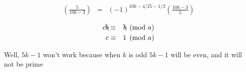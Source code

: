\documentclass[aps,preprint,preprintnumbers,nofootinbib,showpacs,prd]{revtex4-1}
\newcommand{\nbea}{\begin{eqnarray*}}
\newcommand{\neea}{\end{eqnarray*}}
\begin{document}

%
\nbea
\left ( \frac{5}{10k - 3} \right ) & = & (-1)^{10k-4/2 5-1/2} \left ( \frac{10k - 3}{5} \right )
\neea
%




%
\nbea
c\bcancel{b} & \equiv & \bcancel{b} \pmod{a} \\
c & \equiv & 1 \pmod{a}
\neea
%



Well, $5k - 1$ won't work because when $k$ is odd $5k - 1$ will be even, and it will not be prime
\end{document}
